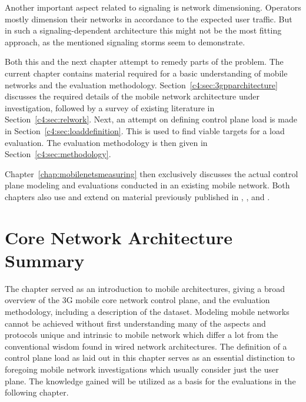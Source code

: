 Another important aspect related to signaling is network dimensioning. Operators mostly dimension their networks in accordance to the expected user traffic. But in such a signaling-dependent architecture this might not be the most fitting approach, as the mentioned signaling storms seem to demonstrate. 

Both this and the next chapter attempt to remedy parts of the problem. The current chapter contains material required for a basic understanding of mobile networks and the evaluation methodology. Section~\ref{c4:sec:3gpparchitecture} discusses the required details of the mobile network architecture under investigation, followed by a survey of existing literature in Section~\ref{c4:sec:relwork}. Next, an attempt on defining control plane load is made in Section~\ref{c4:sec:loaddefinition}. This is used to find viable targets for a load evaluation. The evaluation methodology is then given in Section~\ref{c4:sec:methodology}.

Chapter~\ref{chap:mobilenetsmeasuring} then exclusively discusses the actual control plane modeling and evaluations conducted in an existing mobile network. Both chapters also use and extend on material previously published in \cite{metzger2012research}, 
\cite{metzger2014jcnc}, and \cite{metzger2014lossmodel}.














\section{Core Network Architecture Summary}
\label{c41:sec:conclusion}

The chapter served as an introduction to mobile architectures, giving a broad overview of the \gls{3G} mobile core network control plane, and the evaluation methodology, including a description of the dataset. Modeling mobile networks cannot be achieved without first understanding many of the aspects and protocols unique and intrinsic to mobile network which differ a lot from the conventional wisdom found in wired network architectures. The definition of a control plane load as laid out in this chapter serves as an essential distinction to foregoing mobile network investigations which usually consider just the user plane. The knowledge gained will be utilized as a basis for the evaluations in the following chapter.


